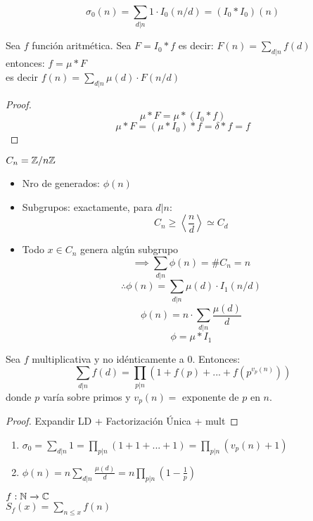 \begin{ejm}
	\[\sigma_0(n)=\sum_{d|n}1\cdot I_0(n/d)=(I_0*I_0)(n)\]
\end{ejm}
\begin{cor}
	Sea $f$ función aritmética. Sea $F=I_0*f$ es decir: $F(n)=\sum_{d|n}f(d)$\\
	entonces: $f=\mu*F$\\
	es decir $f(n)=\sum_{d|n}\mu(d)\cdot F(n/d)$
\end{cor}
\begin{proof}
	\[\mu*F=\mu*(I_0*f)\]
	\[\mu*F=(\mu*I_0)*f=\delta*f=f\]
\end{proof}
\begin{ejm}
	$C_n=\mathbb{Z}/n\mathbb{Z}$
	\begin{itemize}
		\item Nro de generados: $\phi(n)$

		\item Subgrupos: exactamente, para $d|n$:
		      \[C_n\geq\left\langle\frac{n}{d}\right\rangle\simeq C_d\]

		\item Todo $x\in C_n$ genera algún subgrupo
		      \[\implies \sum_{d|n}\phi(n)=\#C_n=n\]
		      \[\therefore \phi(n)=\sum_{d|n}\mu(d)\cdot I_1(n/d)\]
		      \[\phi(n)=n\cdot\sum_{d|n}\frac{\mu(d)}{d}\]
		      \[\phi=\mu*I_1\]
	\end{itemize}
\end{ejm}
\begin{thm}[$\Sigma\rightarrow\Pi$]
	Sea $f$ multiplicativa y no idénticamente a $0$. Entonces:
	\[\sum_{d|n}f(d)=\prod_{p|n}(1+f(p)+...+f(p^{v_p(n)}))\]
	donde $p$ varía sobre primos y $v_p(n)=$ exponente de $p$ en $n$.
\end{thm}
\begin{proof}
	Expandir LD + Factorización Única + mult
\end{proof}
\begin{ejm}
	\begin{enumerate}[label=(\alph*)]
		\item $\sigma_0=\sum_{d|n}1=\prod_{p|n}(1+1+...+1)=\prod_{p|n}(v_p(n)+1)$

		\item $\phi(n)=n\sum_{d|n}\frac{\mu(d)}{d}=n\prod_{p|n}(1-\frac{1}{p})$
	\end{enumerate}
\end{ejm}

\begin{defn}[Sumar]
	$f:\mathbb{N}\xrightarrow[]{}\mathbb{C}$\\
	$S_f(x)=\sum_{n\leq x}f(n)$
\end{defn}

